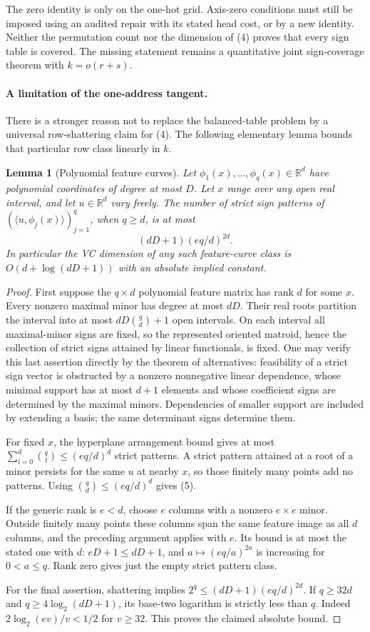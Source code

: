 \documentclass[11pt]{article}
\newtheorem{lemma}{Lemma}
\begin{document}
The zero identity is only on the one-hot grid. Axis-zero conditions
must still be imposed using an audited repair with its stated head
cost, or by a new identity. Neither the permutation count nor the
dimension of (4) proves that every sign table is covered. The missing
statement remains a quantitative joint sign-coverage theorem with
$k=o(r+s)$.

\paragraph{A limitation of the one-address tangent.}
There is a stronger reason not to replace the balanced-table problem
by a universal row-shattering claim for (4). The following elementary
lemma bounds that particular row class linearly in $k$.

\begin{lemma}[Polynomial feature curves]
Let $\phi_1(x),\ldots,\phi_q(x)\in\mathbb R^d$ have polynomial
coordinates of degree at most $D$. Let $x$ range over any open real
interval, and let $u\in\mathbb R^d$ vary freely. The number of strict
sign patterns of $(\langle u,\phi_j(x)\rangle)_{j=1}^q$, when $q\geq d$,
is at most
\[
 (dD+1)(eq/d)^{2d}.
 \tag{5}
\]
In particular the VC dimension of any such feature-curve class is
$O(d+\log(dD+1))$ with an absolute implied constant.
\end{lemma}
\begin{proof}
First suppose the $q\times d$ polynomial feature matrix has rank $d$
for some $x$. Every nonzero maximal minor has degree at most $dD$.
Their real roots partition the interval into at most
$dD\binom qd+1$ open intervals. On each interval all maximal-minor
signs are fixed, so the represented oriented matroid, hence the
collection of strict signs attained by linear functionals, is fixed.
One may verify this last assertion directly by the theorem of
alternatives: feasibility of a strict sign vector is obstructed by a
nonzero nonnegative linear dependence, whose minimal support has at
most $d+1$ elements and whose coefficient signs are determined by
the maximal minors. Dependencies of smaller support are included by
extending a basis; the same determinant signs determine them.

For fixed $x$, the hyperplane arrangement bound gives at most
$\sum_{l=0}^d\binom ql\leq(eq/d)^d$ strict patterns.
A strict pattern attained at a root of a minor persists for the same
$u$ at nearby $x$, so those finitely many points add no patterns.
Using $\binom qd\leq(eq/d)^d$ gives (5).

If the generic rank is $e<d$, choose $e$ columns with a nonzero
$e\times e$ minor. Outside finitely many points these columns span
the same feature image as all $d$ columns, and the preceding argument
applies with $e$. Its bound is at most the stated one with $d$:
$eD+1\leq dD+1$, and $a\mapsto (eq/a)^{2a}$ is increasing for
$0<a\leq q$. Rank zero gives just the empty strict pattern class.

For the final assertion, shattering implies
$2^q\leq(dD+1)(eq/d)^{2d}$. If
$q\geq32d$ and $q\geq4\log_2(dD+1)$, its base-two logarithm is
strictly less than $q$. Indeed
$2\log_2(ev)/v<1/2$ for $v\geq32$.
This proves the claimed absolute bound.
\end{proof}
\end{document}
